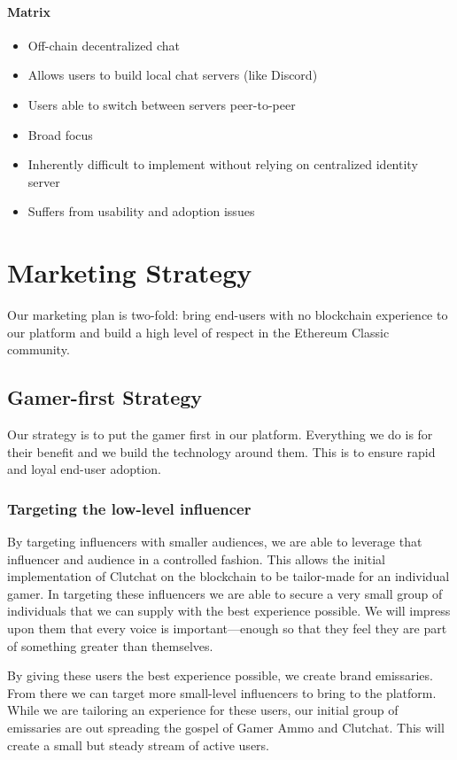 \documentclass[11pt]{report}
\begin{document}
\subsubsection{Matrix\cite{matrix}}
\begin{itemize}
\item Off-chain decentralized chat
\item Allows users to build local chat servers (like Discord)
\item Users able to switch between servers peer-to-peer
\item Broad focus
\item Inherently difficult to implement without relying on centralized identity server
\item Suffers from usability and adoption issues
\end{itemize}
\chapter{Marketing Strategy}
Our marketing plan is two-fold: bring end-users with no blockchain experience to our platform and build a high level of respect in the Ethereum Classic community.
\section{Gamer-first Strategy}
Our strategy is to put the gamer first in our platform. Everything we do is for their benefit and we build the technology around them. This is to ensure rapid and loyal end-user adoption.
\subsection{Targeting the low-level influencer}
By targeting influencers with smaller audiences, we are able to leverage that influencer and audience in a controlled fashion. This allows the initial implementation of Clutchat on the blockchain to be tailor-made for an individual gamer. In targeting these influencers we are able to secure a very small group of individuals that we can supply with the best experience possible. We will impress upon them that every voice is important---enough so that they feel they are part of something greater than themselves. 

By giving these users the best experience possible, we create brand emissaries. From there we can target more small-level influencers to bring to the platform. While we are tailoring an experience for these users, our initial group of emissaries are out spreading the gospel of Gamer Ammo and Clutchat. This will create a small but steady stream of active users.
\end{document}
